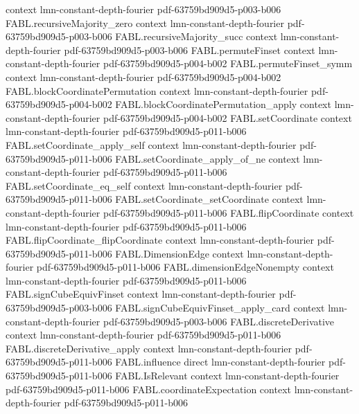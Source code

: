 \begin{theorem}
  {context}
  {lmn-constant-depth-fourier}
  {pdf-63759bd909d5-p003-b006}
\proofstep
  {FABL.recursiveMajority_zero}
  {context}
  {lmn-constant-depth-fourier}
  {pdf-63759bd909d5-p003-b006}
\proofstep
  {FABL.recursiveMajority_succ}
  {context}
  {lmn-constant-depth-fourier}
  {pdf-63759bd909d5-p003-b006}
\proofstep
  {FABL.permuteFinset}
  {context}
  {lmn-constant-depth-fourier}
  {pdf-63759bd909d5-p004-b002}
\proofstep
  {FABL.permuteFinset_symm}
  {context}
  {lmn-constant-depth-fourier}
  {pdf-63759bd909d5-p004-b002}
\proofstep
  {FABL.blockCoordinatePermutation}
  {context}
  {lmn-constant-depth-fourier}
  {pdf-63759bd909d5-p004-b002}
\proofstep
  {FABL.blockCoordinatePermutation_apply}
  {context}
  {lmn-constant-depth-fourier}
  {pdf-63759bd909d5-p004-b002}
\proofstep
  {FABL.setCoordinate}
  {context}
  {lmn-constant-depth-fourier}
  {pdf-63759bd909d5-p011-b006}
\proofstep
  {FABL.setCoordinate_apply_self}
  {context}
  {lmn-constant-depth-fourier}
  {pdf-63759bd909d5-p011-b006}
\proofstep
  {FABL.setCoordinate_apply_of_ne}
  {context}
  {lmn-constant-depth-fourier}
  {pdf-63759bd909d5-p011-b006}
\proofstep
  {FABL.setCoordinate_eq_self}
  {context}
  {lmn-constant-depth-fourier}
  {pdf-63759bd909d5-p011-b006}
\proofstep
  {FABL.setCoordinate_setCoordinate}
  {context}
  {lmn-constant-depth-fourier}
  {pdf-63759bd909d5-p011-b006}
\proofstep
  {FABL.flipCoordinate}
  {context}
  {lmn-constant-depth-fourier}
  {pdf-63759bd909d5-p011-b006}
\proofstep
  {FABL.flipCoordinate_flipCoordinate}
  {context}
  {lmn-constant-depth-fourier}
  {pdf-63759bd909d5-p011-b006}
\proofstep
  {FABL.DimensionEdge}
  {context}
  {lmn-constant-depth-fourier}
  {pdf-63759bd909d5-p011-b006}
\proofstep
  {FABL.dimensionEdgeNonempty}
  {context}
  {lmn-constant-depth-fourier}
  {pdf-63759bd909d5-p011-b006}
\proofstep
  {FABL.signCubeEquivFinset}
  {context}
  {lmn-constant-depth-fourier}
  {pdf-63759bd909d5-p003-b006}
\proofstep
  {FABL.signCubeEquivFinset_apply_card}
  {context}
  {lmn-constant-depth-fourier}
  {pdf-63759bd909d5-p003-b006}
\proofstep
  {FABL.discreteDerivative}
  {context}
  {lmn-constant-depth-fourier}
  {pdf-63759bd909d5-p011-b006}
\proofstep
  {FABL.discreteDerivative_apply}
  {context}
  {lmn-constant-depth-fourier}
  {pdf-63759bd909d5-p011-b006}
\proofstep
  {FABL.influence}
  {direct}
  {lmn-constant-depth-fourier}
  {pdf-63759bd909d5-p011-b006}
\proofstep
  {FABL.IsRelevant}
  {context}
  {lmn-constant-depth-fourier}
  {pdf-63759bd909d5-p011-b006}
\proofstep
  {FABL.coordinateExpectation}
  {context}
  {lmn-constant-depth-fourier}
  {pdf-63759bd909d5-p011-b006}

\end{theorem}
